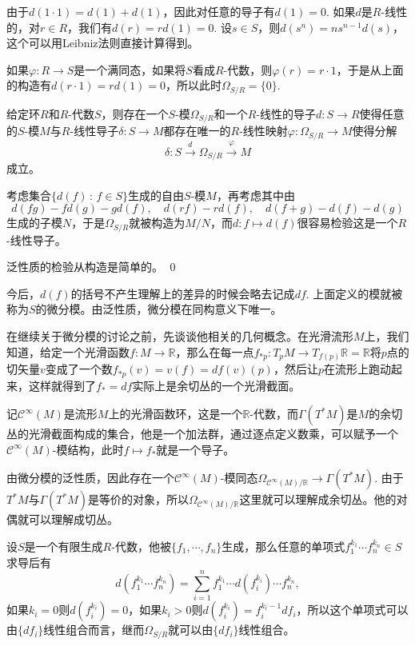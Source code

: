 由于$d(1\cdot 1)=d(1)+d(1)$，因此对任意的导子有$d(1)=0$. 如果$d$是$R$-线性的，对$r\in R$，我们有$d(r)=rd(1)=0$. 设$s\in S$，则$d(s^n)=ns^{n-1}d(s)$，这个可以用Leibniz法则直接计算得到。

如果$\varphi:R\to S$是一个满同态，如果将$S$看成$R$-代数，则$\varphi(r)=r\cdot 1$，于是从上面的构造有$d(r\cdot 1)=rd(1)=0$，所以此时$\Omega_{S/R}=\{0\}$.

\pro 给定环$R$和$R$-代数$S$，则存在一个$S$-模$\Omega_{S/R}$和一个$R$-线性的导子$d:S\to R$使得任意的$S$-模$M$与$R$-线性导子$\delta: S\to M$都存在唯一的$R$-线性映射$\varphi:\Omega_{S/R}\to M$使得分解
\[
	\delta:S\xrightarrow{d}\Omega_{S/R}\xrightarrow{\varphi}M
\]
成立。

\proof
	考虑集合$\{d(f)\,:\, f\in S\}$生成的自由$S$-模$M$，再考虑其中由
	\[
	d(fg)-fd(g)-gd(f),\quad d(rf)-rd(f),\quad d(f+g)-d(f)-d(g)
	\]
	生成的子模$N$，于是$\Omega_{S/R}$就被构造为$M/N$，而$d:f\mapsto d(f)$很容易检验这是一个$R$-线性导子。

	泛性质的检验从构造是简单的。
\qed

今后，$d(f)$的括号不产生理解上的差异的时候会略去记成$df$. 上面定义的模就被称为$S$的微分模。由泛性质，微分模在同构意义下唯一。

\para 在继续关于微分模的讨论之前，先谈谈他相关的几何概念。在光滑流形$M$上，我们知道，给定一个光滑函数$f:M\to \mathbb{R}$，那么在每一点$f_{*p}:T_pM\to T_{f(p)}\mathbb{R}=\mathbb{R}$将$p$点的切矢量$v$变成了一个数$f_{*p}(v)=v(f)=df(v)(p)$，然后让$p$在流形上跑动起来，这样就得到了$f_*=df$实际上是余切丛的一个光滑截面。

记$\mathcal{C}^\infty(M)$是流形$M$上的光滑函数环，这是一个$\mathbb{R}$-代数，而$\Gamma(T^*M)$是$M$的余切丛的光滑截面构成的集合，他是一个加法群，通过逐点定义数乘，可以赋予一个$\mathcal{C}^\infty(M)$-模结构，此时$f\mapsto f_*$就是一个导子。

由微分模的泛性质，因此存在一个$\mathcal{C}^\infty(M)$-模同态$\Omega_{\mathcal{C}^\infty(M)/\mathbb{R}}\to \Gamma(T^*M)$. 由于$T^*M$与$\Gamma(T^*M)$是等价的对象，所以$\Omega_{\mathcal{C}^\infty(M)/\mathbb{R}}$这里就可以理解成余切丛。他的对偶就可以理解成切丛。

\para 设$S$是一个有限生成$R$-代数，他被$\{f_1,\cdots,f_n\}$生成，那么任意的单项式$f_1^{k_1}\cdots f_n^{k_n}\in S$求导后有
\[
	d(f_1^{k_1}\cdots f_n^{k_n})=\sum_{i=1}^n f_1^{k_1}\cdots d(f_i^{k_i})\cdots f_n^{k_n},
\]
如果$k_i=0$则$d(f_i^{k_i})=0$，如果$k_i>0$则$d(f_i^{k_i})=f_i^{k_i-1}df_i$，所以这个单项式可以由$\{df_i\}$线性组合而言，继而$\Omega_{S/R}$就可以由$\{df_i\}$线性组合。

